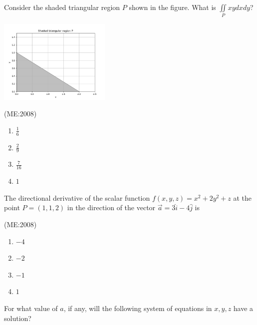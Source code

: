  \item
        Consider the shaded triangular region $P$ shown in the figure. What is $\iint\limits_P xydxdy$?
        \vspace{0.2cm}
		\begin{center}
        \includegraphics[width=0.4\textwidth]{figs/graphme8.png}
		\end{center}
        \vspace{0.2cm}

        \hfill{(ME:2008)}
        \begin{multicols}{4}
            \begin{enumerate}
                \item $\frac{1}{6}$
                \item $\frac{2}{9}$
                \item $\frac{7}{16}$
                \item $1$
            \end{enumerate}
        \end{multicols}
    
    \item 
        The directional derivative of the scalar function $f(x,y,z) = x^2 + 2y^2 + z$ at the point $P = (1,1,2)$ in the direction of the vector $\vec{a} = 3\hat{i} - 4\hat{j}$ is

        \hfill{(ME:2008)}
        \begin{multicols}{4}
            \begin{enumerate}
                \item $-4$
                \item $-2$
                \item $-1$
                \item $1$\\
            \end{enumerate}
        \end{multicols}

    \item
        For what value of $a$, if any, will the following system of equations in $x, y, z$ have a solution?
              
